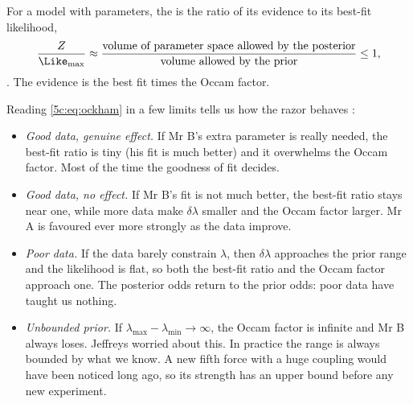 \begin{workdef}
For a model with parameters, the  is the ratio of its evidence
to its best-fit likelihood,
\[
  \frac{Z}{\Like_{\max}}\approx\frac{\text{volume of parameter space allowed by the posterior}}
  {\text{volume allowed by the prior}}\le 1 ,
\]
.
The evidence is the best fit times the Occam factor.
\end{workdef}

Reading \eqref{5c:eq:ockham} in a few limits tells us how the razor behaves
:
\begin{itemize}[itemsep=1pt,leftmargin=1.2em]
  \item \emph{Good data, genuine effect.} If Mr B's extra parameter is really needed,
        the best-fit ratio is tiny (his fit is much better) and it overwhelms the
        Occam factor. Most of the time the goodness of fit decides.
  \item \emph{Good data, no effect.} If Mr B's fit is not much better, the best-fit
        ratio stays near one, while more data make $\delta\lambda$ smaller and the Occam
        factor larger. Mr A is favoured ever more strongly as the data improve.
  \item \emph{Poor data.} If the data barely constrain $\lambda$, then $\delta\lambda$
        approaches the prior range and the likelihood is flat, so both the best-fit
        ratio and the Occam factor approach one. The posterior odds return to the
        prior odds: poor data have taught us nothing.
  \item \emph{Unbounded prior.} If $\lambda_{\max}-\lambda_{\min}\to\infty$, the Occam
        factor is infinite and Mr B always loses. Jeffreys worried about this. In
        practice the range is always bounded by what we know. A new fifth force with
        a huge coupling would have been noticed long ago, so its strength has an upper
        bound before any new experiment.
\end{itemize}

